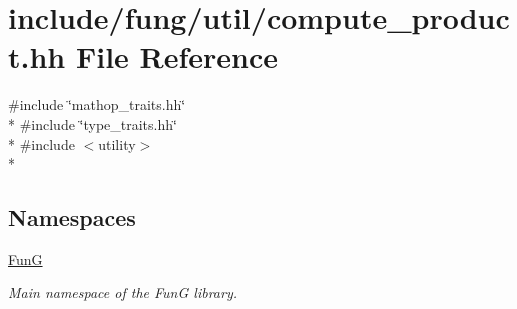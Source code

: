 \hypertarget{compute__product_8hh}{\section{include/fung/util/compute\-\_\-product.hh File Reference}
\label{compute__product_8hh}
}
{\ttfamily \#include \char`\"{}mathop\-\_\-traits.\-hh\char`\"{}}\\*
{\ttfamily \#include \char`\"{}type\-\_\-traits.\-hh\char`\"{}}\\*
{\ttfamily \#include $<$utility$>$}\\*
\subsection*{Namespaces}
\begin{DoxyCompactItemize}
\item 
\hyperlink{namespaceFunG}{Fun\-G}
\begin{DoxyCompactList}\small\item\em Main namespace of the Fun\-G library. \end{DoxyCompactList}\end{DoxyCompactItemize}
